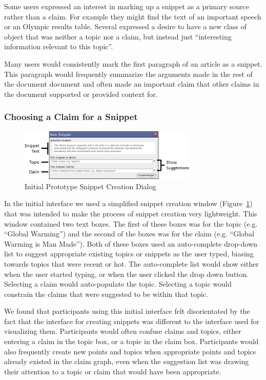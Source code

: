 \documentclass{chi2009}
\begin{document}
Some users expressed an interest in marking up a snippet as a primary source rather than a claim. For example they might find the text of an important speech or an Olympic results table. Several expressed a desire to have a new class of object that was neither a topic nor a claim, but instead just ``interesting information relevant to this topic''.

Many users would consistently mark the first paragraph of an article as a snippet. This paragraph would frequently summarize the arguments made in the rest of the document document and often made an important claim that other claims in the document supported or provided context for. 


\subsubsection{Choosing a Claim for a Snippet}

\begin{figure}[t]
	\includegraphics[width=8.5cm]{../screenshots/oldsnipcreate_diagram.png}
	\caption{Initial Prototype Snippet Creation Dialog}
	\label{oldsnippetbox}
\end{figure}

In the initial interface we used a simplified snippet creation window (Figure~\ref{oldsnippetbox}) that was intended to make the process of snippet creation very lightweight. This window contained two text boxes. The first of these boxes was for the topic (e.g. ``Global Warming'') and the second of the boxes was for the claim (e.g. ``Global Warming is Man Made''). Both of these boxes used an auto-complete drop-down list to suggest appropriate existing topics or snippets as the user typed, 
biasing towards topics that were recent or hot. The auto-complete list would show either when the user started typing, or when the user clicked the drop down button. Selecting a claim would auto-populate the topic. Selecting a topic would constrain the claims that were suggested to be within that topic.

We found that participants using this initial interface felt disorientated by the fact that the interface for creating snippets was different to the interface used for visualizing them. Participants would often confuse claims and topics, either entering a claim in the topic box, or a topic in the claim box. Participants would also frequently create new points and topics when appropriate points and topics already existed in the claim graph, even when the suggestion list was drawing their attention to a topic or claim that would have been appropriate.
\end{document}
